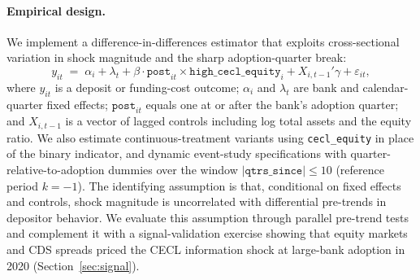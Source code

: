 \paragraph{Empirical design.}
We implement a difference-in-differences estimator that exploits cross-sectional
variation in shock magnitude and the sharp adoption-quarter break:
\begin{equation}
  y_{it}
  \;=\;
  \alpha_i + \lambda_t
  + \beta \cdot \texttt{post}_{it} \times \texttt{high\_cecl\_equity}_{i}
  + X_{i,t-1}'\gamma
  + \varepsilon_{it},
  \label{eq:baseline}
\end{equation}
where $y_{it}$ is a deposit or funding-cost outcome; $\alpha_i$ and $\lambda_t$
are bank and calendar-quarter fixed effects; $\texttt{post}_{it}$ equals one at
or after the bank's adoption quarter; and $X_{i,t-1}$ is a vector of lagged
controls including log total assets and the equity ratio. We also estimate
continuous-treatment variants using \texttt{cecl\_equity} in place of the binary
indicator, and dynamic event-study specifications with quarter-relative-to-adoption
dummies over the window $|\texttt{qtrs\_since}| \leq 10$ (reference period
$k = -1$). The identifying assumption is that, conditional on fixed effects and
controls, shock magnitude is uncorrelated with differential pre-trends in
depositor behavior. We evaluate this assumption through parallel pre-trend tests
and complement it with a signal-validation exercise showing that equity markets
and CDS spreads priced the CECL information shock at large-bank adoption in 2020
(Section~\ref{sec:signal}).
